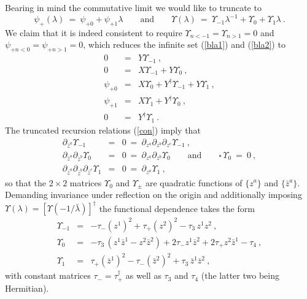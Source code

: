\documentclass[a4paper,11pt,english]{article}
\numberwithin{equation}{section}
\renewcommand{\=}{\ =\ }
\begin{document}
Bearing in mind the commutative limit \cite{Crane:im} we would like to
truncate to
\begin{equation}
 \psi_+(\lambda)\=\psi_{+0}+\psi_{+1}\lambda
 \qquad\text{and}\qquad
 \Upsilon(\lambda)\=\Upsilon_{-1}\lambda^{-1}+\Upsilon_{0}+\Upsilon_{1}\lambda
 \ .
\end{equation}
We claim that it is indeed consistent to require 
$\Upsilon_{n<-1}=\Upsilon_{n>1}=0$ and $\psi_{+n<0}=\psi_{+n>1}=0$,
which reduces the infinite set (\ref{bla1}) and (\ref{bla2}) to
\begin{subequations}
\begin{eqnarray}
         0 &=& Y\Upsilon_{-1}\ ,\label{fina}\\
         0 &=& X\Upsilon_{-1}+Y\Upsilon_0\ ,\label{finb}\\
 \psi_{+0} &=& X\Upsilon_0+Y^\dagger\Upsilon_{-1}+Y\Upsilon_1\ ,\label{finc}\\
 \psi_{+1} &=& X\Upsilon_1+Y^\dagger\Upsilon_0\ ,\label{find}\\
         0 &=& Y^\dagger\Upsilon_1\ .\label{fine}
\end{eqnarray}
\end{subequations}
The truncated recursion relations (\ref{con}) imply that
\begin{subequations}
\begin{eqnarray}
\partial_{\bar{z}^a} \Upsilon_{-1} &=& 0 \= 
\partial_{{z}^a}\partial_{{z}^b}\partial_{{z}^c} \Upsilon_{-1}\ ,\\
\partial_{\bar{z}^a}\partial_{\bar{z}^b} \Upsilon_0 &=& 0 \=
\partial_{{z}^a}\partial_{{z}^b} \Upsilon_0 \qquad\text{and}\qquad
\square\,\Upsilon_0\=0\ ,\\
\partial_{\bar{z}^a}\partial_{\bar{z}^b}\partial_{\bar{z}^c}\Upsilon_1 &=& 0\=
\partial_{{z}^a} \Upsilon_1\ , 
\end{eqnarray}
\end{subequations}
so that the $2{\times}2$ matrices $\Upsilon_0$ and $\Upsilon_\pm$ 
are quadratic functions of $\{z^a\}$ and $\{\bar{z}^a\}$.
Demanding invariance under reflection on the origin and additionally imposing
$\Upsilon(\lambda)=[\Upsilon(-1/\bar{\lambda})]^\dagger$ 
the functional dependence takes the form
\begin{subequations}
\begin{eqnarray}
\Upsilon_{-1} &=& -\tau_-(z^1)^2 + \tau_+ (z^2)^2 - \tau_3\,z^1z^2\ ,\\
\Upsilon_0    &=& -\tau_3\,(z^1\bar{z}^1-z^2\bar{z}^2)
                  +2\tau_-z^1\bar{z}^2+2\tau_+z^2\bar{z}^1-\tau_4\ ,\\ 
\Upsilon_1    &=&  \tau_+(\bar{z}^1)^2 - \tau_- (\bar{z}^2)^2 
                  +\tau_3\,\bar{z}^1\bar{z}^2\ ,
\end{eqnarray}
\end{subequations}
with constant matrices $\tau_-=\tau_+^\dagger$ as well as
$\tau_3$ and $\tau_4$ (the latter two being Hermitian).
\end{document}
